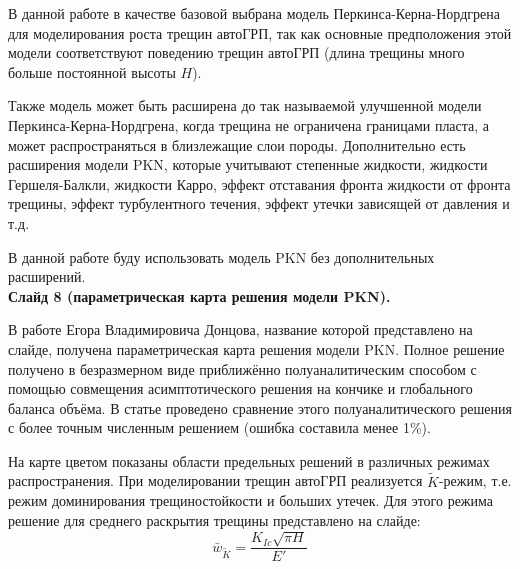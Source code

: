 \documentclass[a4paper, 12pt]{article}
\begin{document}
В данной работе в качестве базовой выбрана модель Перкинса-Керна-Нордгрена для моделирования роста трещин автоГРП, так как основные предположения этой модели соответствуют поведению трещин автоГРП (длина трещины много больше постоянной высоты $H$).


Также модель может быть расширена до так называемой улучшенной модели Перкинса-Керна-Нордгрена, когда трещина не ограничена границами пласта, а может распространяться в близлежащие слои породы.
Дополнительно есть расширения модели PKN, которые учитывают степенные жидкости, жидкости Гершеля-Балкли, жидкости Карро, эффект отставания фронта жидкости от фронта трещины, эффект турбулентного течения, эффект утечки зависящей от давления и т.д.

В данной работе буду использовать модель PKN без дополнительных расширений.
\\


\textbf{Слайд 8 (параметрическая карта решения модели PKN).}

В работе Егора Владимировича Донцова, название которой представлено на слайде, получена параметрическая карта решения модели PKN.
Полное решение получено в безразмерном виде приближённо полуаналитическим способом с помощью совмещения асимптотического решения на кончике и глобального баланса объёма.
В статье проведено сравнение этого полуаналитического решения с более точным численным решением (ошибка составила менее 1\%).

На карте цветом показаны области предельных решений в различных режимах распространения.
При моделировании трещин автоГРП реализуется $\tilde{K}$-режим, т.е. режим доминирования трещиностойкости и больших утечек.
Для этого режима решение для среднего раскрытия трещины представлено на слайде:
$$
\bar{w}_{\tilde{K}}=\frac{K_{Ic}\sqrt{\pi H}}{E'}
$$\\
\end{document}
